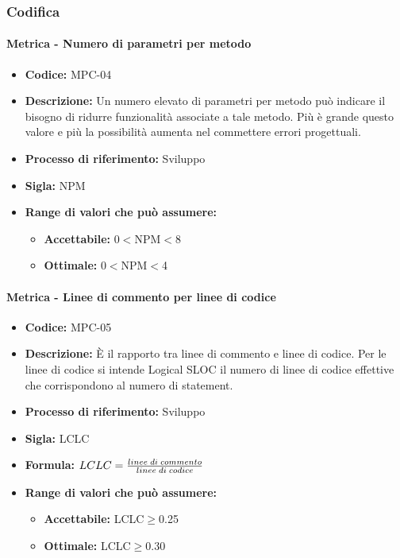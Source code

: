 \subsubsection{Codifica}  
    \paragraph{Metrica - Numero di parametri per metodo} 
    \begin{itemize}
        \item \textbf{Codice:} MPC-04
        \item \textbf{Descrizione:} Un numero elevato di parametri per metodo può indicare il bisogno di ridurre funzionalità associate a tale metodo. Più è grande questo valore e più la possibilità aumenta nel commettere errori progettuali.
        \item \textbf{Processo di riferimento:} Sviluppo
        \item \textbf{Sigla:} NPM
        \item \textbf{Range di valori che può assumere:}
        \begin{itemize}
            \item \textbf{Accettabile:} 0$<$NPM$<$8
            \item \textbf{Ottimale:} 0$<$NPM$<$4
        \end{itemize}
    \end{itemize}

    \paragraph{Metrica - Linee di commento per linee di codice}
    \begin{itemize}
        \item \textbf{Codice:} MPC-05
        \item \textbf{Descrizione:} È il rapporto tra linee di commento e linee di codice. Per le linee di codice si intende Logical SLOC il numero di linee di codice effettive che corrispondono al numero di statement.
        \item \textbf{Processo di riferimento:} Sviluppo
        \item \textbf{Sigla:} LCLC
        \item \textbf{Formula:} \begin{math}{LCLC = {linee \; di \; commento\over linee \; di \; codice}}\end{math}
        \item \textbf{Range di valori che può assumere:}
        \begin{itemize}
            \item \textbf{Accettabile:} LCLC$\geq$0.25
            \item \textbf{Ottimale:} LCLC$\geq$0.30
        \end{itemize}
    \end{itemize}

